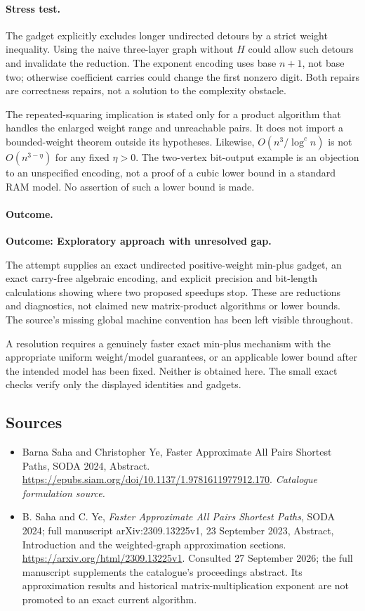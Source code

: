 \documentclass[11pt,a4paper]{article}
\numberwithin{equation}{section}
\begin{document}
\paragraph{Stress test.}
The gadget explicitly excludes longer undirected detours by a strict
weight inequality. Using the naive three-layer graph without $H$ could
allow such detours and invalidate the reduction. The exponent encoding
uses base $n+1$, not base two; otherwise coefficient carries could change
the first nonzero digit. Both repairs are correctness repairs, not a
solution to the complexity obstacle.

The repeated-squaring implication is stated only for a product algorithm
that handles the enlarged weight range and unreachable pairs. It does
not import a bounded-weight theorem outside its hypotheses. Likewise,
$O(n^3/\log^c n)$ is not $O(n^{3-\eta})$ for any fixed $\eta>0$.
The two-vertex bit-output example is an objection to an unspecified
encoding, not a proof of a cubic lower bound in a standard RAM model.
No assertion of such a lower bound is made.

\paragraph{Outcome.}
\textbf{Outcome: Exploratory approach with unresolved gap.}

The attempt supplies an exact undirected positive-weight min-plus gadget,
an exact carry-free algebraic encoding, and explicit precision and
bit-length calculations showing where two proposed speedups stop.
These are reductions and diagnostics, not claimed new matrix-product
algorithms or lower bounds. The source's missing global machine convention
has been left visible throughout.

A resolution requires a genuinely faster exact min-plus mechanism with
the appropriate uniform weight/model guarantees, or an applicable lower
bound after the intended model has been fixed. Neither is obtained here.
The small exact checks verify only the displayed identities and gadgets.
\subsection{Sources}
\begin{itemize}\raggedright
\item[\textnormal{[S1]}]\hypertarget{source:statement:1}{} Barna Saha and Christopher Ye, Faster Approximate All Pairs Shortest Paths, SODA 2024, Abstract.
\url{https://epubs.siam.org/doi/10.1137/1.9781611977912.170}.
{\small\textit{Catalogue formulation source.}}
\item[\textnormal{[E1]}]\hypertarget{extra:statement:1}{}
B. Saha and C. Ye, \emph{Faster Approximate All Pairs Shortest Paths},
SODA 2024; full manuscript arXiv:2309.13225v1, 23 September 2023,
Abstract, Introduction and the weighted-graph approximation sections.
\url{https://arxiv.org/html/2309.13225v1}.
Consulted 27 September 2026; the full manuscript supplements the
catalogue's proceedings abstract. Its approximation results and
historical matrix-multiplication exponent are not promoted to an exact
current algorithm.
\end{itemize}
\end{document}
